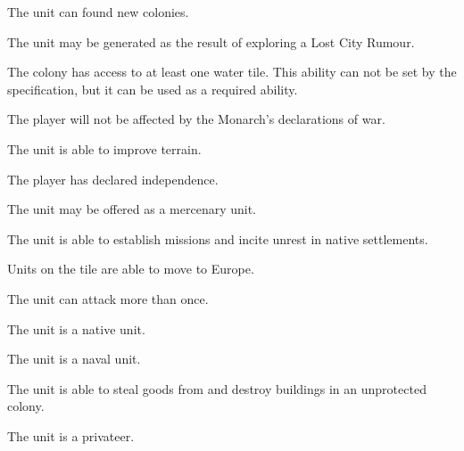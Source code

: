 \documentclass[12pt]{book}
\begin{document}
\affectsUnit

The unit can found new colonies.

\affectsUnit

The unit may be generated as the result of exploring a Lost City Rumour.

\affectsColony

The colony has access to at least one water tile. This ability can not
be set by the specification, but it can be used as a required ability.

\affectsPlayer

The player will not be affected by the Monarch's declarations of war.

\affectsUnit

The unit is able to improve terrain.

\affectsPlayer

The player has declared independence.

\affectsUnit

The unit may be offered as a mercenary unit.

\affectsUnit

The unit is able to establish missions and incite unrest in native
settlements.

\affectsTile

Units on the tile are able to move to Europe.

\affectsUnit

The unit can attack more than once.

\affectsUnit

The unit is a native unit.

\affectsUnit

The unit is a naval unit.

\affectsUnit

The unit is able to steal goods from and destroy buildings in an
unprotected colony.

\affectsUnit

The unit is a privateer.
\end{document}
